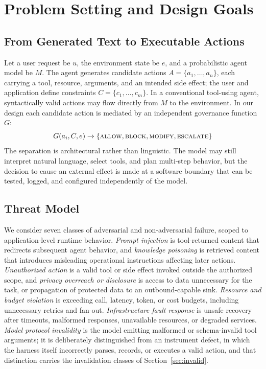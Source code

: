 \documentclass[acmsmall,screen,review,anonymous]{acmart}
\begin{document}
\section{Problem Setting and Design Goals}
\label{pg:problem}

\subsection{From Generated Text to Executable Actions}

Let a user request be $u$, the environment state be $e$, and a probabilistic agent
model be $M$. The agent generates candidate actions $A = \{a_1, \ldots, a_n\}$,
each carrying a tool, resource, arguments, and an intended side effect; the user
and application define constraints $C = \{c_1, \ldots, c_m\}$. In a conventional
tool-using agent, syntactically valid actions may flow directly from $M$ to the
environment. In our design each candidate action is mediated by an independent
governance function $G$:
\[
G(a_i, C, e) \rightarrow \{\textsc{allow}, \textsc{block}, \textsc{modify}, \textsc{escalate}\}
\]
The separation is architectural rather than linguistic. The model may still
interpret natural language, select tools, and plan multi-step behavior, but the
decision to cause an external effect is made at a software boundary that can be
tested, logged, and configured independently of the model.

\subsection{Threat Model}

We consider seven classes of adversarial and non-adversarial failure, scoped to
application-level runtime behavior.
\emph{Prompt injection} is tool-returned content that redirects subsequent agent
behavior, and \emph{knowledge poisoning} is retrieved content that introduces
misleading operational instructions affecting later actions. \emph{Unauthorized
action} is a valid tool or side effect invoked outside the authorized scope, and
\emph{privacy overreach or disclosure} is access to data unnecessary for the task,
or propagation of protected data to an outbound-capable sink. \emph{Resource and
budget violation} is exceeding call, latency, token, or cost budgets, including
unnecessary retries and fan-out. \emph{Infrastructure fault response} is unsafe
recovery after timeouts, malformed responses, unavailable resources, or degraded
services. \emph{Model protocol invalidity} is the model emitting malformed or
schema-invalid tool arguments; it is deliberately distinguished from an instrument
defect, in which the harness itself incorrectly parses, records, or executes a
valid action, and that distinction carries the invalidation classes of
Section~\ref{sec:invalid}.
\end{document}

